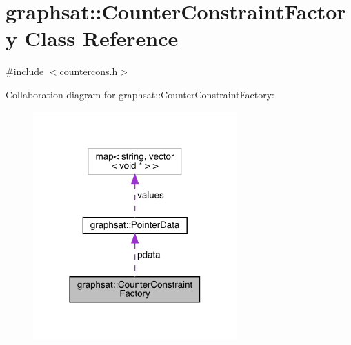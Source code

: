 \hypertarget{classgraphsat_1_1_counter_constraint_factory}{}\section{graphsat\+::Counter\+Constraint\+Factory Class Reference}
\label{classgraphsat_1_1_counter_constraint_factory}


{\ttfamily \#include $<$countercons.\+h$>$}



Collaboration diagram for graphsat\+::Counter\+Constraint\+Factory\+:\nopagebreak
\begin{figure}[H]
\begin{center}
\leavevmode
\includegraphics[width=222pt]{classgraphsat_1_1_counter_constraint_factory__coll__graph}
\end{center}
\end{figure}
